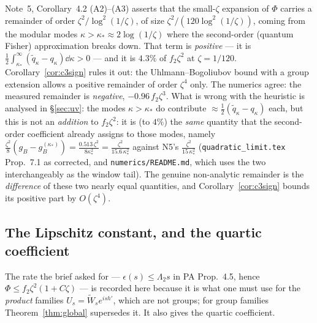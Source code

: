 \documentclass[11pt]{article}
\newcommand{\Wt}{\widetilde W}
\begin{document}
\begin{verdictbreak}
Note~5, Corollary~4.2 (A2)--(A3) asserts that the small-$\zeta$ expansion of $\Phi$ carries a
remainder of order $\zeta^2/\log^2(1/\zeta)$, of size $\zeta^2/(120\log^2(1/\zeta))$, coming from
the modular modes $\kappa>\kappa_*\approx2\log(1/\zeta)$ where the second-order (quantum Fisher)
approximation breaks down.  That term is \emph{positive} --- it is $\frac12\int_{\kappa_*}^\infty
(\widetilde q_\kappa-q_\kappa)\dd\kappa>0$ --- and it is $4.3\%$ of $f_2\zeta^2$ at $\zeta=1/120$.
Corollary~\ref{cor:c3sign} rules it out: the Uhlmann--Bogoliubov bound with a group extension
allows a positive remainder of order $\zeta^4$ only.  The numerics agree: the measured remainder is
\emph{negative}, $-0.96\,f_2\zeta^3$.  What is wrong with the heuristic is analysed in
\S\ref{sec:uv}: the modes $\kappa>\kappa_*$ do contribute
$\approx\frac12(\widetilde q_\kappa-q_\kappa)$ each, but this is not an \emph{addition} to
$f_2\zeta^2$: it is (to $4\%$) the \emph{same} quantity that the second-order coefficient already
assigns to those modes, namely $\frac{\zeta^2}8(g_B-g_B^{(\kappa_*)})=\frac{0.513\,\zeta^2}
{8\kappa_*^2}=\frac{\zeta^2}{15.6\,\kappa_*^2}$ against N5's $\frac{\zeta^2}{15\,\kappa_*^2}$
(\texttt{quadratic\_limit.tex} Prop.~7.1 as corrected, and \texttt{numerics/README.md}, which uses
the two interchangeably as the window tail).  The genuine non-analytic remainder is the
\emph{difference} of these two nearly equal quantities, and Corollary~\ref{cor:c3sign} bounds its
positive part by $O(\zeta^4)$.
\end{verdictbreak}


\subsection{The Lipschitz constant, and the quartic coefficient}\label{sec:lip}

The rate the brief asked for --- $\epsilon(s)\le\Lambda_2s$ in PA Prop.~4.5, hence
$\Phi\le f_2\zeta^2(1+C\zeta)$ --- is recorded here because it is what one must use for the
\emph{product} families $U_s=\Wt_se^{ish'}$, which are not groups; for group families
Theorem~\ref{thm:global} supersedes it.  It also gives the quartic coefficient.
\end{document}
